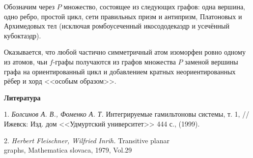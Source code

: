 	Обозначим через $P$ множество, состоящее из следующих графов: одна вершина, одно ребро, простой цикл, сети правильных призм и антипризм, Платоновых и Архимедовых тел (исключая ромбоусеченный икосододекаэдр и усечённый кубоктаэдр).



 Оказывается, что любой частично симметричный атом изоморфен ровно одному из атомов, чьи $f$-графы получаются из графов множества $P$ заменой вершины графа на ориентированный цикл и добавлением кратных неориентированных рёбер и хорд <<особым образом>>.






\smallskip \centerline {\bf Литература} \nopagebreak

1. {\it Болсинов А. В., Фоменко А. Т.} Интегрируемые гамильтоновы системы, т. 1, // Ижевск: Изд. дом <<Удмуртский университет>> 444 с., (1999).

2. {\it Herbert Fleischner, Wilfried Inrih.} Transitive planar\\graphs, Mathematica slovaca, 1979, Vol.29
